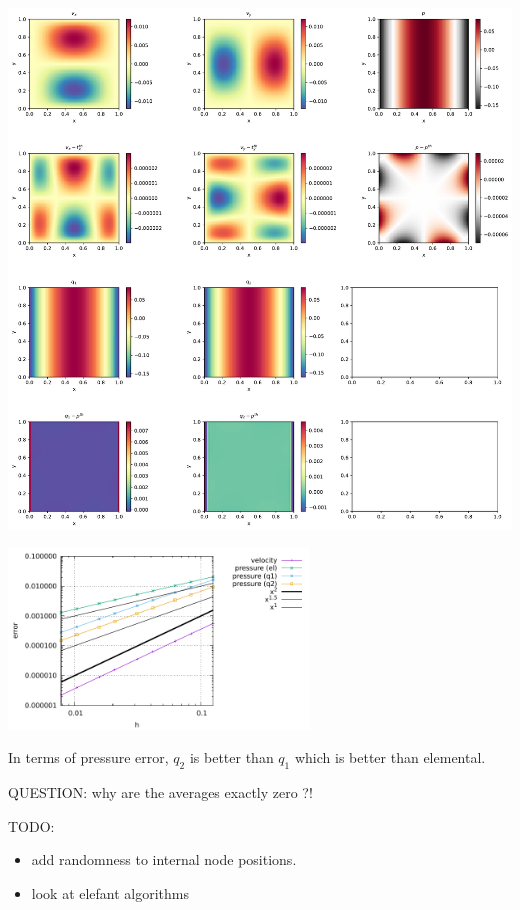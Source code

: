 \includegraphics[width=15cm]{python_codes/fieldstone_12/solution}

\includegraphics[width=8cm]{python_codes/fieldstone_12/errors}

In terms of pressure error, $q_2$ is better than $q_1$ which is better than elemental.

QUESTION: why are the averages exactly zero ?!

TODO: 
\begin{itemize}
\item add randomness to internal node positions.
\item look at elefant algorithms
\end{itemize}
